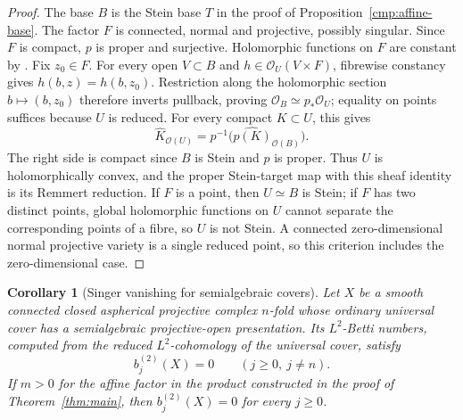 \documentclass[11pt]{article}
\newtheorem{corollary}[theorem]{Corollary}
\theoremstyle{definition}
\theoremstyle{remark}
\begin{document}
\begin{proof}
The base \(B\) is the Stein base \(T\) in the proof of
Proposition~\ref{cmp:affine-base}. The factor \(F\) is connected,
normal and projective, possibly singular. Since \(F\) is compact,
\(p\) is proper and surjective. Holomorphic functions on \(F\) are
constant by \cite[Corollary~II.5.8]{Demailly2012}.
Fix \(z_0\in F\). For every open \(V\subset B\) and
\(h\in\mathcal O_U(V\times F)\), fibrewise constancy gives
\(h(b,z)=h(b,z_0)\). Restriction along the holomorphic section
\(b\mapsto(b,z_0)\) therefore inverts pullback, proving
\(\mathcal O_B\simeq p_*\mathcal O_U\); equality on points suffices
because \(U\) is reduced. For every compact \(K\subset U\), this gives
\[
 \widehat K_{\mathcal O(U)}
   =p^{-1}\bigl(\widehat{p(K)}_{\mathcal O(B)}\bigr).
\]
The right side is compact since \(B\) is Stein and \(p\) is proper.
Thus \(U\) is holomorphically convex, and the proper Stein-target map
with this sheaf identity is its Remmert reduction.
If \(F\) is a point, then \(U\simeq B\) is Stein; if \(F\) has two
distinct points, global holomorphic functions on \(U\) cannot separate
the corresponding points of a fibre, so \(U\) is not Stein.
A connected zero-dimensional normal projective variety is a single
reduced point, so this criterion includes the zero-dimensional case.
\end{proof}

\begin{corollary}[Singer vanishing for semialgebraic covers]
\label{cor:singer-semialgebraic}
Let \(X\) be a smooth connected closed aspherical projective complex
\(n\)-fold whose ordinary universal cover has a semialgebraic
projective-open presentation. Its \(L^2\)-Betti numbers, computed from
the reduced \(L^2\)-cohomology of the universal cover, satisfy
\[
                 b_j^{(2)}(X)=0\qquad(j\geq0,\ j\ne n).
\]
If \(m>0\) for the affine factor in the product constructed in the
proof of Theorem~\ref{thm:main}, then \(b_j^{(2)}(X)=0\) for every
\(j\geq0\).
\end{corollary}
\end{document}
